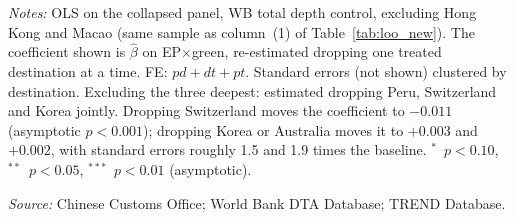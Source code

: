 \begin{table}[p]
\begin{threeparttable}
\begin{tablenotes}[flushleft]
\item \emph{Notes:} OLS on the collapsed panel, WB total depth control, excluding Hong Kong and Macao (same sample as column~(1) of Table~\ref{tab:loo_new}). The coefficient shown is $\widehat{\beta}$ on EP$\times$green, re-estimated dropping one treated destination at a time. FE: $pd + dt + pt$. Standard errors (not shown) clustered by destination. Excluding the three deepest: estimated dropping Peru, Switzerland and Korea jointly. Dropping Switzerland moves the coefficient to $-0.011$ (asymptotic $p < 0.001$); dropping Korea or Australia moves it to $+0.003$ and $+0.002$, with standard errors roughly 1.5 and 1.9 times the baseline. $^{*}$~$p<0.10$, $^{**}$~$p<0.05$, $^{***}$~$p<0.01$ (asymptotic).
\item \textit{Source:} Chinese Customs Office; World Bank DTA Database; TREND Database.
\end{tablenotes}
\end{threeparttable}
\end{table}
